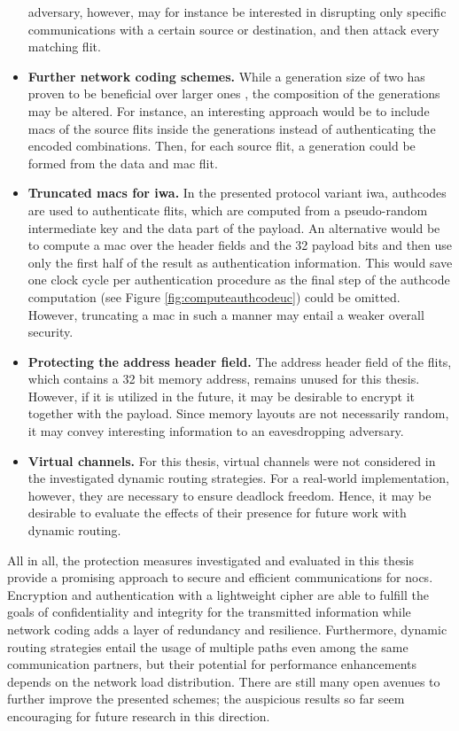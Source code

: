 \begin{itemize}
        adversary, however, may for instance be interested in disrupting only specific communications with a certain source or destination, and then
        attack every matching flit.
    \item \textbf{Further network coding schemes.} While a generation size of two has proven to be beneficial over larger ones
        \cite{moriam15manycorenc}, the composition of the generations may be altered. For instance, an interesting approach would be to include
        \glspl{mac} of the source flits inside the generations instead of authenticating the encoded combinations. Then, for each source flit, a
        generation could be formed from the data and \gls{mac} flit.
    \item \textbf{Truncated \glspl{mac} for \gls{iwa}.} In the presented protocol variant \gls{iwa}, authcodes are used to authenticate flits, which
        are computed from a pseudo-random intermediate key and the data part of the payload. An alternative would be to compute a \gls{mac} over the
        header fields and the 32 payload bits and then use only the first half of the result as authentication information. This would
        save one clock cycle per authentication procedure as the final step of the authcode computation (see Figure \ref{fig:computeauthcodeuc}) could
        be omitted. However, truncating a \gls{mac} in such a manner may entail a weaker overall security.
    \item \textbf{Protecting the address header field.} The address header field of the flits, which contains a 32 bit memory address, remains unused
        for this thesis. However, if it is utilized in the future, it may be desirable to encrypt it together with the payload. Since memory layouts
        are not necessarily random, it may convey interesting information to an eavesdropping adversary.
    \item \textbf{Virtual channels.} For this thesis, virtual channels were not considered in the investigated dynamic routing strategies. For a
        real-world implementation, however, they are necessary to ensure deadlock freedom. Hence, it may be desirable to evaluate the effects of their
        presence for future work with dynamic routing.
\end{itemize}
\vspace{0.5\baselineskip}

All in all, the protection measures investigated and evaluated in this thesis provide a promising approach to secure and efficient communications for
\glspl{noc}. Encryption and authentication with a lightweight cipher are able to fulfill the goals of confidentiality and integrity for the
transmitted information while network coding adds a layer of redundancy and resilience. Furthermore, dynamic routing strategies entail the usage of
multiple paths even among the same communication partners, but their potential for performance enhancements depends on the network load distribution. There are still many open
avenues to further improve the presented schemes; the auspicious results so far seem encouraging for future research in this direction.
